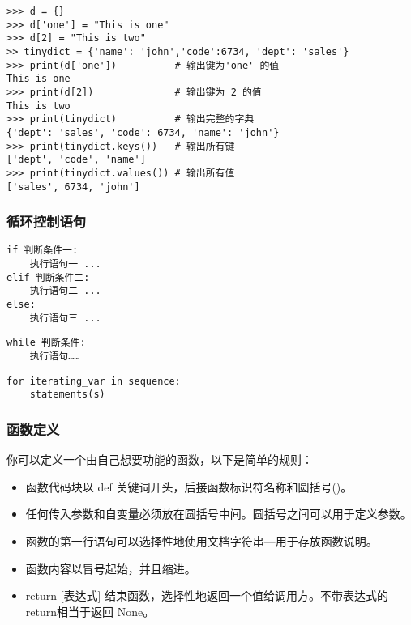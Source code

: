 \begin{verbatim}
>>> d = {}
>>> d['one'] = "This is one"
>>> d[2] = "This is two"
>> tinydict = {'name': 'john','code':6734, 'dept': 'sales'}
>>> print(d['one'])          # 输出键为'one' 的值
This is one
>>> print(d[2])              # 输出键为 2 的值
This is two
>>> print(tinydict)          # 输出完整的字典
{'dept': 'sales', 'code': 6734, 'name': 'john'}
>>> print(tinydict.keys())   # 输出所有键
['dept', 'code', 'name']
>>> print(tinydict.values()) # 输出所有值
['sales', 6734, 'john']
\end{verbatim}

\subsubsection{循环控制语句}

\begin{verbatim}
if 判断条件一:
    执行语句一 ...
elif 判断条件二:
    执行语句二 ...
else:
    执行语句三 ...
\end{verbatim}

\begin{verbatim}
while 判断条件:
    执行语句……
\end{verbatim}

\begin{verbatim}
for iterating_var in sequence:
    statements(s)
\end{verbatim}

\subsubsection{函数定义}

你可以定义一个由自己想要功能的函数，以下是简单的规则：
\begin{itemize}
\item 函数代码块以 def 关键词开头，后接函数标识符名称和圆括号()。
\item 任何传入参数和自变量必须放在圆括号中间。圆括号之间可以用于定义参数。
\item 函数的第一行语句可以选择性地使用文档字符串—用于存放函数说明。
\item 函数内容以冒号起始，并且缩进。
\item return [表达式] 结束函数，选择性地返回一个值给调用方。不带表达式的return相当于返回 None。
\end{itemize}

